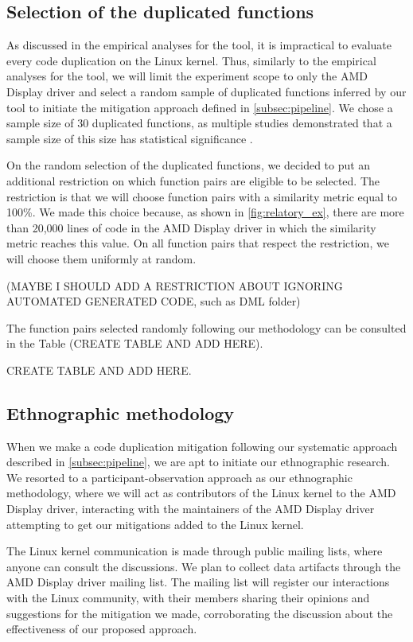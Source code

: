 \subsection{Selection of the duplicated functions}

As discussed in the empirical analyses for the tool, it is impractical to evaluate every code 
duplication on the Linux kernel. Thus, similarly to the empirical analyses for the tool, we will 
limit the experiment scope to only the AMD Display driver and select a random sample of duplicated 
functions inferred by our tool to initiate the mitigation approach defined in \ref{subsec:pipeline}. 
We chose a sample size of 30 duplicated functions, as multiple studies demonstrated that a sample 
size of this size has statistical significance \citep{sample1,sample2}.

On the random selection of the duplicated functions, we decided to put an additional restriction 
on which function pairs are eligible to be selected. The restriction is that we will choose function 
pairs with a similarity metric equal to 100\%. We made this choice because, as shown in \ref{fig:relatory_ex},
there are more than 20,000 lines of code in the AMD Display driver in which the similarity metric 
reaches this value. On all function pairs that respect the restriction, we will choose them 
uniformly at random.

(MAYBE I SHOULD ADD A RESTRICTION ABOUT IGNORING AUTOMATED GENERATED CODE, such as DML folder)

The function pairs selected randomly following our methodology can be consulted in the Table
(CREATE TABLE AND ADD HERE).

CREATE TABLE AND ADD HERE.

\subsection{Ethnographic methodology}

When we make a code duplication mitigation following our systematic approach described in 
\ref{subsec:pipeline}, we are apt to initiate our ethnographic research. We resorted to a
participant-observation approach as our ethnographic methodology, where we will act as 
contributors of the Linux kernel to the AMD Display driver, interacting with the maintainers 
of the AMD Display driver attempting to get our mitigations added to the Linux kernel. 

The Linux kernel communication is made through public mailing lists, where anyone can consult 
the discussions. We plan to collect data artifacts through the AMD Display driver mailing list. 
The mailing list will register our interactions with the Linux community, with their members 
sharing their opinions and suggestions for the mitigation we made, corroborating the discussion 
about the effectiveness of our proposed approach.

